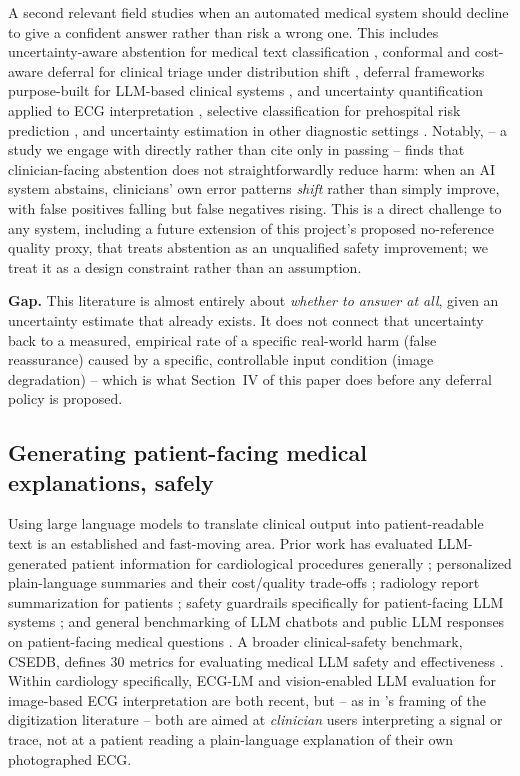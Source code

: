 \documentclass[conference]{IEEEtran}
\begin{document}
A second relevant field studies when an automated medical system should decline to
give a confident answer rather than risk a wrong one. This includes uncertainty-aware
abstention for medical text classification \cite{ref23}, conformal and cost-aware
deferral for clinical triage under distribution shift \cite{ref24,ref27}, deferral
frameworks purpose-built for LLM-based clinical systems \cite{ref25}, and
uncertainty quantification applied to ECG
interpretation \cite{ref30,ref31}, selective classification for prehospital risk
prediction \cite{ref32}, and uncertainty estimation in other diagnostic
settings \cite{ref28,ref29}. Notably, \cite{ref26} -- a study
we engage with directly rather than cite only in passing -- finds that
clinician-facing abstention does not straightforwardly reduce harm: when an AI system
abstains, clinicians' own error patterns \emph{shift} rather than simply improve,
with false positives falling but false negatives rising. This is a direct challenge
to any system, including a future extension of this project's proposed no-reference
quality proxy, that treats abstention as an unqualified safety improvement; we treat
it as a design constraint rather than an assumption.

\textbf{Gap.} This literature is almost entirely about \emph{whether to answer at
all}, given an uncertainty estimate that already exists. It does not connect that
uncertainty back to a measured, empirical rate of a specific real-world harm (false
reassurance) caused by a specific, controllable input condition (image degradation)
-- which is what Section~IV of this paper does before any deferral policy is
proposed.

\subsection{Generating patient-facing medical explanations, safely}

Using large language models to translate clinical output into patient-readable text
is an established and fast-moving area. Prior work has evaluated LLM-generated
patient information for cardiological procedures generally \cite{ref33}; personalized
plain-language summaries and their cost/quality trade-offs \cite{ref34}; radiology
report summarization for patients \cite{ref38}; safety guardrails specifically for
patient-facing LLM systems \cite{ref39}; and general benchmarking of LLM chatbots and
public LLM responses on patient-facing medical
questions \cite{ref40,ref41,ref42,ref43}. A broader clinical-safety benchmark, CSEDB,
defines 30 metrics for evaluating medical LLM safety and effectiveness \cite{ref35}.
Within cardiology specifically, ECG-LM \cite{ref36} and vision-enabled LLM evaluation
for image-based ECG interpretation \cite{ref37} are both recent, but -- as
in \cite{ref2}'s framing of the digitization literature -- both are aimed at
\emph{clinician} users interpreting a signal or trace, not at a patient reading a
plain-language explanation of their own photographed ECG.
\end{document}
